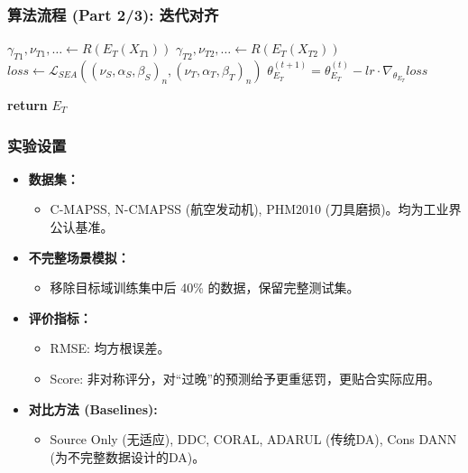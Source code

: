 \documentclass{beamer}
\begin{document}
\begin{frame}
    \frametitle{算法流程 (Part 2/3): 迭代对齐}
    \begin{algorithm}[H]
        \caption{EviAdapt: Iterative Alignment}
        \begin{algorithmic}[1]
            \setcounter{ALG@line}{7} %
            
                \State $\gamma_{T1}, \nu_{T1}, \dots \gets R(E_T(X_{T1}))$ 
                \State $\gamma_{T2}, \nu_{T2}, \dots \gets R(E_T(X_{T2}))$ 
                \State $loss \gets \mathcal{L}_{SEA}((\nu_S, \alpha_S, \beta_S)_n, (\nu_T, \alpha_T, \beta_T)_n)$ 
                \State $\theta_{E_T}^{(t+1)} = \theta_{E_T}^{(t)} - lr \cdot \nabla_{\theta_{E_T}} loss$ 
            \EndWhile
            
            \State \textbf{return} $E_T$
        \end{algorithmic}
    \end{algorithm}
\end{frame}



\begin{frame}
    \frametitle{实验设置}
    \begin{itemize}
        \item \textbf{数据集：}
        \begin{itemize}
            \item C-MAPSS, N-CMAPSS (航空发动机), PHM2010 (刀具磨损)。均为工业界公认基准。
        \end{itemize}
        \item \textbf{不完整场景模拟：}
        \begin{itemize}
            \item \alert{移除目标域训练集中后 40\% 的数据}，保留完整测试集。
        \end{itemize}
        \item \textbf{评价指标：}
        \begin{itemize}
            \item RMSE: 均方根误差。
            \item Score: 非对称评分，对“过晚”的预测给予更重惩罚，更贴合实际应用。
        \end{itemize}
        \item \textbf{对比方法 (Baselines):}
        \begin{itemize}
            \item Source Only (无适应), DDC, CORAL, ADARUL (传统DA), Cons DANN (为不完整数据设计的DA)。
        \end{itemize}
    \end{itemize}
\end{frame}
\end{document}
